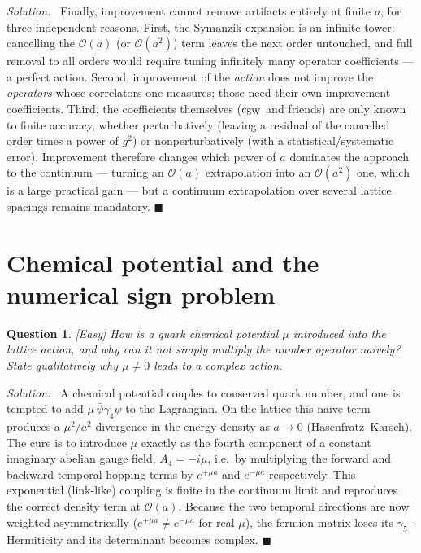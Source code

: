 \documentclass[11pt]{article}
\newcommand{\diff}[1]{\textcolor{blue!60!black}{\footnotesize\textsf{[#1]}}\quad}
\newtheorem{question}{Question}
\newenvironment{solution}{\par\smallskip\noindent\textit{Solution.}\ }{\hfill$\blacksquare$\par\smallskip}
\begin{document}
\begin{solution}
Finally, improvement cannot remove artifacts entirely at finite $a$, for three independent reasons. First, the Symanzik expansion is an infinite tower: cancelling the $\mathcal{O}(a)$ (or $\mathcal{O}(a^2)$) term leaves the next order untouched, and full removal to all orders would require tuning infinitely many operator coefficients --- a perfect action. Second, improvement of the \emph{action} does not improve the \emph{operators} whose correlators one measures; those need their own improvement coefficients. Third, the coefficients themselves ($c_{\rm SW}$ and friends) are only known to finite accuracy, whether perturbatively (leaving a residual of the cancelled order times a power of $g^2$) or nonperturbatively (with a statistical/systematic error). Improvement therefore changes which power of $a$ dominates the approach to the continuum --- turning an $\mathcal{O}(a)$ extrapolation into an $\mathcal{O}(a^2)$ one, which is a large practical gain --- but a continuum extrapolation over several lattice spacings remains mandatory.
\end{solution}

\section{Chemical potential and the numerical sign problem}

\begin{question}
\diff{Easy} How is a quark chemical potential $\mu$ introduced into the lattice action, and why can it not simply multiply the number operator naively? State qualitatively why $\mu \neq 0$ leads to a complex action.
\end{question}
\begin{solution}
A chemical potential couples to conserved quark number, and one is tempted to add $\mu\,\bar\psi\gamma_4\psi$ to the Lagrangian. On the lattice this naive term produces a $\mu^2/a^2$ divergence in the energy density as $a\to0$ (Hasenfratz--Karsch). The cure is to introduce $\mu$ exactly as the fourth component of a constant imaginary abelian gauge field, $A_4 = -i\mu$, i.e.\ by multiplying the forward and backward temporal hopping terms by $e^{+\mu a}$ and $e^{-\mu a}$ respectively. This exponential (link-like) coupling is finite in the continuum limit and reproduces the correct density term at $\mathcal{O}(a)$. Because the two temporal directions are now weighted asymmetrically ($e^{+\mu a}\neq e^{-\mu a}$ for real $\mu$), the fermion matrix loses its $\gamma_5$-Hermiticity and its determinant becomes complex.
\end{solution}
\end{document}
